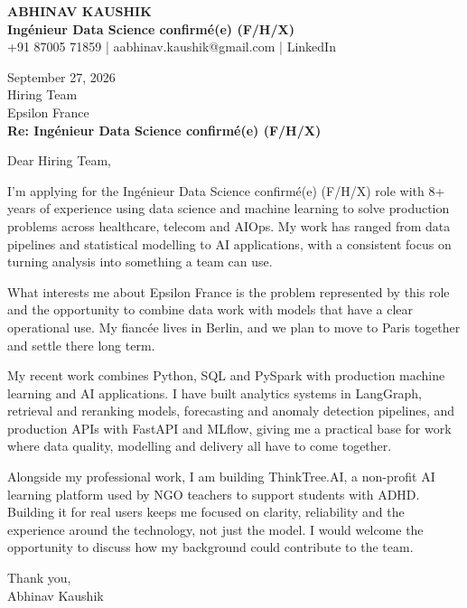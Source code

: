 \documentclass[10pt,a4paper]{article}
\begin{document}
\begin{center}
{\Large\bfseries ABHINAV KAUSHIK}\\[2pt]
{\bfseries Ingénieur Data Science confirmé(e) (F/H/X)}\\[2pt]
+91 87005 71859 \quad | \quad aabhinav.kaushik@gmail.com \quad | \quad LinkedIn
\end{center}
\vspace{8pt}
September 27, 2026\\[6pt]
Hiring Team\\
Epsilon France\\[4pt]
\textbf{Re: Ingénieur Data Science confirmé(e) (F/H/X)}

Dear Hiring Team,

I’m applying for the Ingénieur Data Science confirmé(e) (F/H/X) role with 8+ years of experience using data science and machine learning to solve production problems across healthcare, telecom and AIOps. My work has ranged from data pipelines and statistical modelling to AI applications, with a consistent focus on turning analysis into something a team can use.

What interests me about Epsilon France is the problem represented by this role and the opportunity to combine data work with models that have a clear operational use. My fiancée lives in Berlin, and we plan to move to Paris together and settle there long term.

My recent work combines Python, SQL and PySpark with production machine learning and AI applications. I have built analytics systems in LangGraph, retrieval and reranking models, forecasting and anomaly detection pipelines, and production APIs with FastAPI and MLflow, giving me a practical base for work where data quality, modelling and delivery all have to come together.

Alongside my professional work, I am building ThinkTree.AI, a non-profit AI learning platform used by NGO teachers to support students with ADHD. Building it for real users keeps me focused on clarity, reliability and the experience around the technology, not just the model. I would welcome the opportunity to discuss how my background could contribute to the team.

Thank you,\\
Abhinav Kaushik
\end{document}
